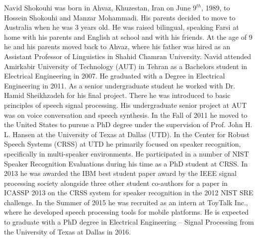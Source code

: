 \documentclass[doublespacing]{utdthesis}
\begin{document}
\mainmatter

















\begin{thesisbib}

\end{thesisbib}  %

\begin{vita}
Navid Shokouhi was born in Ahvaz, Khuzestan, Iran on June $9^{th}$, 1989, to Hossein Shokouhi and Manzar Mohammadi. 
His parents decided to move to Australia when he was 3 years old.
He was raised bilingual, speaking Farsi at home with his parents and English at school and with his friends. 
At the age of 9 he and his parents moved back to Ahvaz, where his father was hired as an Assistant Professor of Linguistics in Shahid Chamran University. 
Navid attended Amirkabir University of Technology (AUT) in Tehran as a Bachelors student in Electrical Engineering in 2007. 
He graduated with a Degree in Electrical Engineering in 2011. 
As a senior undergraduate student he worked with Dr. Hamid Sheikhzadeh for his final project. 
There he was introduced to basic principles of speech signal processing. 
His undergraduate senior project at AUT was on voice conversation and speech synthesis. 
In the Fall of 2011 he moved to the United States to pursue a PhD degree under the supervision of Prof. John H. L. Hansen at the University of Texas at Dallas (UTD). 
In the Center for Robust Speech Systems (CRSS) at UTD he primarily focused on speaker recognition, specifically in multi-speaker environments. 
He participated in a number of NIST Speaker Recognition Evaluations during his time as a PhD student at CRSS. 
In 2013 he was awarded the IBM best student paper award by the IEEE signal processing society alongside three other student co-authors for a paper in ICASSP 2013 on the CRSS system for speaker recognition in the 2012 NIST SRE challenge. 
In the Summer of 2015 he was recruited as an intern at ToyTalk Inc., where he developed speech processing tools for mobile platforms. 
He is expected to graduate with a PhD degree in Electrical Engineering -- Signal Processing from the University of Texas at Dallas in 2016. 
\end{vita}
\end{document}
